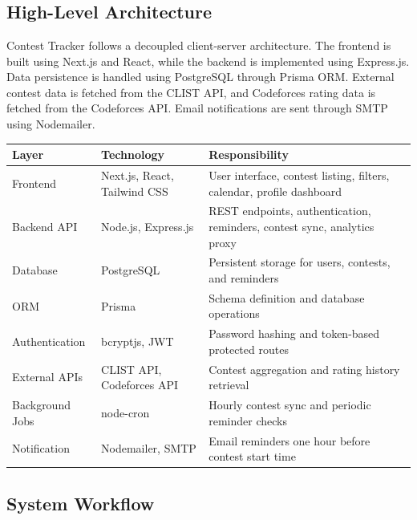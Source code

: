 \documentclass[12pt,a4paper]{report}
\begin{document}
\chapter{}
\begin{normalsize}

\section{High-Level Architecture}

Contest Tracker follows a decoupled client-server architecture. The frontend is built using Next.js and React, while the backend is implemented using Express.js. Data persistence is handled using PostgreSQL through Prisma ORM. External contest data is fetched from the CLIST API, and Codeforces rating data is fetched from the Codeforces API. Email notifications are sent through SMTP using Nodemailer.

\begin{center}
\begin{tabular}{|p{3.2cm}|p{4.2cm}|p{6.2cm}|}
\hline
\textbf{Layer} & \textbf{Technology} & \textbf{Responsibility} \\
\hline
Frontend & Next.js, React, Tailwind CSS & User interface, contest listing, filters, calendar, profile dashboard \\
\hline
Backend API & Node.js, Express.js & REST endpoints, authentication, reminders, contest sync, analytics proxy \\
\hline
Database & PostgreSQL & Persistent storage for users, contests, and reminders \\
\hline
ORM & Prisma & Schema definition and database operations \\
\hline
Authentication & bcryptjs, JWT & Password hashing and token-based protected routes \\
\hline
External APIs & CLIST API, Codeforces API & Contest aggregation and rating history retrieval \\
\hline
Background Jobs & node-cron & Hourly contest sync and periodic reminder checks \\
\hline
Notification & Nodemailer, SMTP & Email reminders one hour before contest start time \\
\hline
\end{tabular}
\end{center}

\section{System Workflow}


\end{normalsize}
\end{document}
